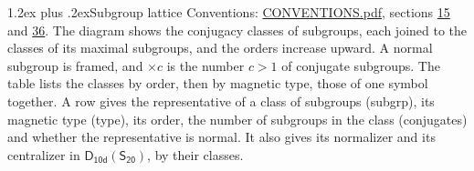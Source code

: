 \documentclass[10pt,a4paper]{article}
\makeatletter
\renewcommand\section{\@startsection{section}{1}{\z@}{-3ex plus -1ex minus -.2ex}%
  {1.2ex plus .2ex}{\normalfont\large\sffamily\bfseries\color{parttitle}}}
\numberwithin{equation}{section}
\newcommand{\grp}[1]{\mathsf{#1}}
\makeatother
\begin{document}
\section{Subgroup lattice}\label{s:subgroups}
Conventions: \href{../../CONVENTIONS.pdf}{CONVENTIONS.pdf}, sections \href{../../../rotation/CONVENTIONS.pdf\#conv.15}{15} and \href{../../CONVENTIONS.pdf\#conv.36}{36}.
The diagram shows the conjugacy classes of subgroups, each joined to the classes of its maximal subgroups, and the orders increase upward. \label{n:index.conjugates.c}\label{n:mark.conjugates}A normal subgroup is framed, and ${\times}c$ is the number $c > 1$ of conjugate subgroups. The table lists the classes by order, then by magnetic type, those of one symbol together. \label{n:head.subgroup}\label{n:head.magnetic.type}\label{n:head.order}\label{n:head.conjugates}\label{n:head.normal}A row gives the representative of a class of subgroups (subgrp), its magnetic type (type), its order, the number of subgroups in the class (conjugates) and whether the representative is normal. \label{n:head.normalizer}\label{n:head.centralizer}It also gives its normalizer and its centralizer in $\grp{D_{10d}}(\grp{S_{20}})$, by their classes. 
\end{document}
